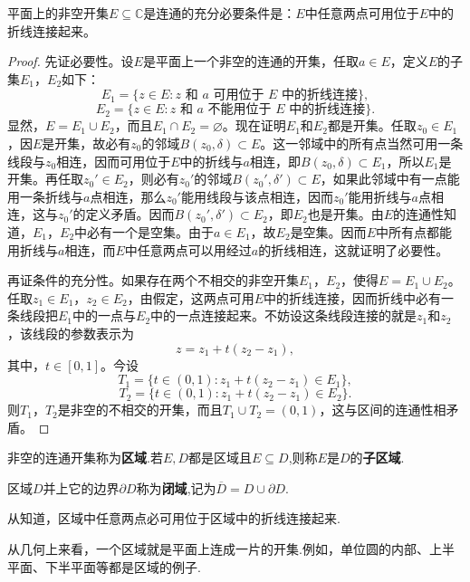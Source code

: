 \documentclass[../../main.tex]{subfiles}%
\begin{document}
\begin{theorem}\label{theorem:连通集合的性质}
平面上的非空开集\(E\subseteq \mathbb{C}\)是连通的充分必要条件是：\(E\)中任意两点可用位于\(E\)中的折线连接起来。
\end{theorem}
\begin{proof}
先证必要性。设\(E\)是平面上一个非空的连通的开集，任取\(a \in E\)，定义\(E\)的子集\(E_1\)，\(E_2\)如下：
\[
E_1 = \{ z \in E : z \text{ 和 } a \text{ 可用位于 } E \text{ 中的折线连接} \},
\]
\[
E_2 = \{ z \in E : z \text{ 和 } a \text{ 不能用位于 } E \text{ 中的折线连接} \}.
\]
显然，\(E = E_1 \cup E_2\)，而且\(E_1 \cap E_2 = \varnothing\)。现在证明\(E_1\)和\(E_2\)都是开集。任取\(z_0 \in E_1\)，因\(E\)是开集，故必有\(z_0\)的邻域\(B(z_0, \delta) \subset E\)。这一邻域中的所有点当然可用一条线段与\(z_0\)相连，因而可用位于\(E\)中的折线与\(a\)相连，即\(B(z_0, \delta) \subset E_1\)，所以\(E_1\)是开集。再任取\(z_0' \in E_2\)，则必有\(z_0'\)的邻域\(B(z_0', \delta') \subset E\)，如果此邻域中有一点能用一条折线与\(a\)点相连，那么\(z_0'\)能用线段与该点相连，因而\(z_0'\)能用折线与\(a\)点相连，这与\(z_0'\)的定义矛盾。因而\(B(z_0', \delta') \subset E_2\)，即\(E_2\)也是开集。由\(E\)的连通性知道，\(E_1\)，\(E_2\)中必有一个是空集。由于\(a \in E_1\)，故\(E_2\)是空集。因而\(E\)中所有点都能用折线与\(a\)相连，而\(E\)中任意两点可以用经过\(a\)的折线相连，这就证明了必要性。

再证条件的充分性。如果存在两个不相交的非空开集\(E_1\)，\(E_2\)，使得\(E = E_1 \cup E_2\)。任取\(z_1 \in E_1\)，\(z_2 \in E_2\)，由假定，这两点可用\(E\)中的折线连接，因而折线中必有一条线段把\(E_1\)中的一点与\(E_2\)中的一点连接起来。不妨设这条线段连接的就是\(z_1\)和\(z_2\)，该线段的参数表示为
\[
z = z_1 + t(z_2 - z_1),
\]
其中，\(t \in [0, 1]\)。今设
\[
T_1 = \{ t \in (0, 1) : z_1 + t(z_2 - z_1) \in E_1 \},
\]
\[
T_2 = \{ t \in (0, 1) : z_1 + t(z_2 - z_1) \in E_2 \}.
\]
则\(T_1\)，\(T_2\)是非空的不相交的开集，而且\(T_1 \cup T_2 = (0, 1)\)，这与区间的连通性相矛盾。 
\end{proof}

\begin{definition}[区域]
非空的连通开集称为\textbf{区域}.若$E,D$都是区域且$E\subseteq D$,则称$E$是$D$的\textbf{子区域}.

区域$D$并上它的边界$\partial D$称为\textbf{闭域},记为$\overline{D}=D\cup \partial D.$
\end{definition}
\begin{note}
从知道，区域中任意两点必可用位于区域中的折线连接起来.

从几何上来看，一个区域就是平面上连成一片的开集.例如，单位圆的内部、上半平面、下半平面等都是区域的例子.
\end{note}
\end{document}
